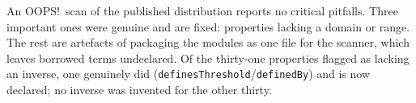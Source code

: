 An OOPS!\ scan of the published distribution reports no critical pitfalls.
Three important ones were genuine and are fixed: properties lacking a domain or
range. The rest are artefacts of packaging the modules as one file for the
scanner, which leaves borrowed terms undeclared. Of the thirty-one
properties flagged as lacking an inverse, one genuinely did
(\texttt{definesThreshold}/\texttt{definedBy}) and is now declared; no inverse
was invented for the other thirty.